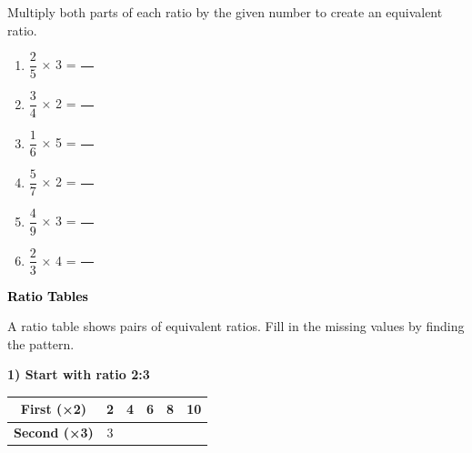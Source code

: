 \documentclass[12pt, letterpaper, fleqn]{article}
\begin{document}
\noindent
Multiply both parts of each ratio by the given number to create an equivalent ratio.

\vspace{3mm}

\begin{enumerate}[itemsep=2cm, leftmargin=0.6cm]

\item $\dfrac{2}{5}$ × 3 = $\dfrac{\phantom{00}}{\phantom{00}}$

\item $\dfrac{3}{4}$ × 2 = $\dfrac{\phantom{00}}{\phantom{00}}$

\item $\dfrac{1}{6}$ × 5 = $\dfrac{\phantom{00}}{\phantom{00}}$

\item $\dfrac{5}{7}$ × 2 = $\dfrac{\phantom{00}}{\phantom{00}}$

\item $\dfrac{4}{9}$ × 3 = $\dfrac{\phantom{00}}{\phantom{00}}$

\item $\dfrac{2}{3}$ × 4 = $\dfrac{\phantom{00}}{\phantom{00}}$

\end{enumerate}

\newpage

\begin{tcolorbox}[colback=customteal!20]
\large\textcolor{black}{\textbf{Ratio Tables}}
\end{tcolorbox}

\noindent
A ratio table shows pairs of equivalent ratios. Fill in the missing values by finding the pattern.

\vspace{1cm}

\noindent
\textbf{1) Start with ratio 2:3}

\begin{center}
\begin{tabular}{|c|c|c|c|c|c|}
\hline
\textbf{First (×2)} & 2 & 4 & 6 & 8 & 10 \\
\hline
\textbf{Second (×3)} & 3 & \phantom{00} & \phantom{00} & \phantom{00} & \phantom{00} \\
\hline
\end{tabular}
\end{center}

\vspace{2cm}
\end{document}
